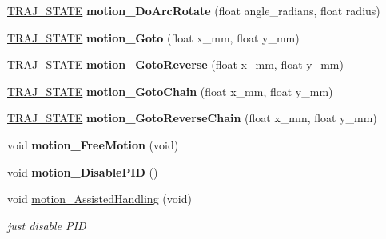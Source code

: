 \begin{DoxyCompactItemize}
\item 
\mbox{\label{classAsservN_a5f56b0af802203f4f4f6d3ec160b1b44}} 
\hyperlink{path__manager_8h_adb3360abeb29758da93865c8afcb80eb}{T\+R\+A\+J\+\_\+\+S\+T\+A\+TE} {\bfseries motion\+\_\+\+Do\+Arc\+Rotate} (float angle\+\_\+radians, float radius)
\item 
\mbox{\label{classAsservN_ab2e3a15f544fa5a91388bed5d85e23ee}} 
\hyperlink{path__manager_8h_adb3360abeb29758da93865c8afcb80eb}{T\+R\+A\+J\+\_\+\+S\+T\+A\+TE} {\bfseries motion\+\_\+\+Goto} (float x\+\_\+mm, float y\+\_\+mm)
\item 
\mbox{\label{classAsservN_aa96de08c966c3c436b7394c1da30829c}} 
\hyperlink{path__manager_8h_adb3360abeb29758da93865c8afcb80eb}{T\+R\+A\+J\+\_\+\+S\+T\+A\+TE} {\bfseries motion\+\_\+\+Goto\+Reverse} (float x\+\_\+mm, float y\+\_\+mm)
\item 
\mbox{\label{classAsservN_af752b6ca5bb9746c6d36d8afea5279dc}} 
\hyperlink{path__manager_8h_adb3360abeb29758da93865c8afcb80eb}{T\+R\+A\+J\+\_\+\+S\+T\+A\+TE} {\bfseries motion\+\_\+\+Goto\+Chain} (float x\+\_\+mm, float y\+\_\+mm)
\item 
\mbox{\label{classAsservN_a5c0b3eb6123a63db0be64b7fffbc4c42}} 
\hyperlink{path__manager_8h_adb3360abeb29758da93865c8afcb80eb}{T\+R\+A\+J\+\_\+\+S\+T\+A\+TE} {\bfseries motion\+\_\+\+Goto\+Reverse\+Chain} (float x\+\_\+mm, float y\+\_\+mm)
\item 
\mbox{\label{classAsservN_a0b2775d27df7c46f5610a33cfc440f17}} 
void {\bfseries motion\+\_\+\+Free\+Motion} (void)
\item 
\mbox{\label{classAsservN_aaeef54f7dc01a4b2ecd9d5b36bfdf96f}} 
void {\bfseries motion\+\_\+\+Disable\+P\+ID} ()
\item 
\mbox{\label{classAsservN_aabc80ed92d945446839d0a3773281145}} 
void \hyperlink{classAsservN_aabc80ed92d945446839d0a3773281145}{motion\+\_\+\+Assisted\+Handling} (void)
\begin{DoxyCompactList}\small\item\em just disable P\+ID \end{DoxyCompactList}\item 

\end{DoxyCompactItemize}
